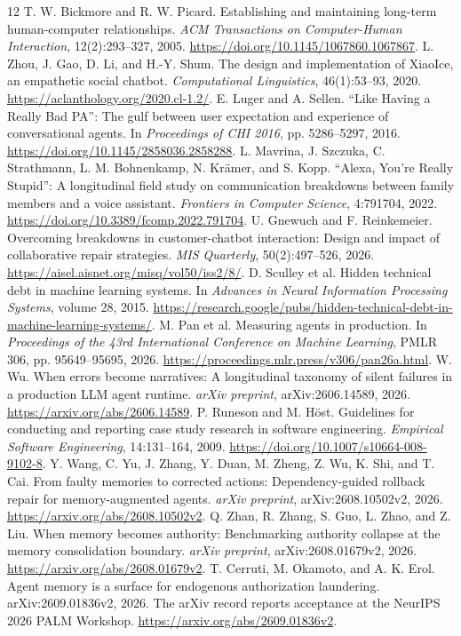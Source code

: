 \documentclass[11pt,a4paper]{article}
\begin{document}
\begin{thebibliography}{12}
 T. W. Bickmore and R. W. Picard. Establishing and maintaining long-term human-computer relationships. \emph{ACM Transactions on Computer-Human Interaction}, 12(2):293--327, 2005. \url{https://doi.org/10.1145/1067860.1067867}.
 L. Zhou, J. Gao, D. Li, and H.-Y. Shum. The design and implementation of XiaoIce, an empathetic social chatbot. \emph{Computational Linguistics}, 46(1):53--93, 2020. \url{https://aclanthology.org/2020.cl-1.2/}.
 E. Luger and A. Sellen. ``Like Having a Really Bad PA'': The gulf between user expectation and experience of conversational agents. In \emph{Proceedings of CHI 2016}, pp. 5286--5297, 2016. \url{https://doi.org/10.1145/2858036.2858288}.
 L. Mavrina, J. Szczuka, C. Strathmann, L. M. Bohnenkamp, N. Kr\"amer, and S. Kopp. ``Alexa, You're Really Stupid'': A longitudinal field study on communication breakdowns between family members and a voice assistant. \emph{Frontiers in Computer Science}, 4:791704, 2022. \url{https://doi.org/10.3389/fcomp.2022.791704}.
 U. Gnewuch and F. Reinkemeier. Overcoming breakdowns in customer-chatbot interaction: Design and impact of collaborative repair strategies. \emph{MIS Quarterly}, 50(2):497--526, 2026. \url{https://aisel.aisnet.org/misq/vol50/iss2/8/}.
 D. Sculley et al. Hidden technical debt in machine learning systems. In \emph{Advances in Neural Information Processing Systems}, volume 28, 2015. \url{https://research.google/pubs/hidden-technical-debt-in-machine-learning-systems/}.
 M. Pan et al. Measuring agents in production. In \emph{Proceedings of the 43rd International Conference on Machine Learning}, PMLR 306, pp. 95649--95695, 2026. \url{https://proceedings.mlr.press/v306/pan26a.html}.
 W. Wu. When errors become narratives: A longitudinal taxonomy of silent failures in a production LLM agent runtime. \emph{arXiv preprint}, arXiv:2606.14589, 2026. \url{https://arxiv.org/abs/2606.14589}.
 P. Runeson and M. H\"ost. Guidelines for conducting and reporting case study research in software engineering. \emph{Empirical Software Engineering}, 14:131--164, 2009. \url{https://doi.org/10.1007/s10664-008-9102-8}.
 Y. Wang, C. Yu, J. Zhang, Y. Duan, M. Zheng, Z. Wu, K. Shi, and T. Cai. From faulty memories to corrected actions: Dependency-guided rollback repair for memory-augmented agents. \emph{arXiv preprint}, arXiv:2608.10502v2, 2026. \url{https://arxiv.org/abs/2608.10502v2}.
 Q. Zhan, R. Zhang, S. Guo, L. Zhao, and Z. Liu. When memory becomes authority: Benchmarking authority collapse at the memory consolidation boundary. \emph{arXiv preprint}, arXiv:2608.01679v2, 2026. \url{https://arxiv.org/abs/2608.01679v2}.
 T. Cerruti, M. Okamoto, and A. K. Erol. Agent memory is a surface for endogenous authorization laundering. arXiv:2609.01836v2, 2026. The arXiv record reports acceptance at the NeurIPS 2026 PALM Workshop. \url{https://arxiv.org/abs/2609.01836v2}.
\end{thebibliography}
\end{document}
